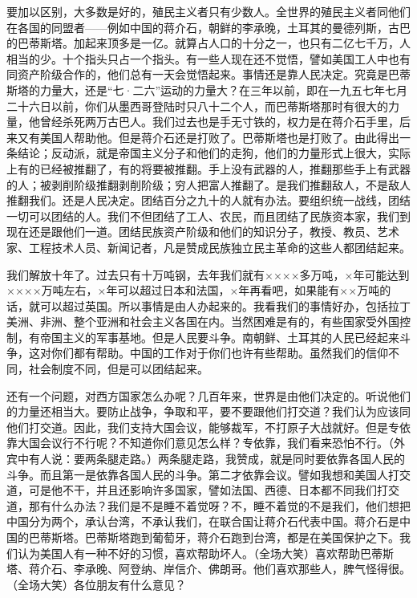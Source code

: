 要加以区别，大多数是好的，殖民主义者只有少数人。全世界的殖民主义者同他们在各国的同盟者——例如中国的蒋介石，朝鲜的李承晚，土耳其的曼德列斯，古巴的巴蒂斯塔。加起来顶多是一亿。就算占人口的十分之一，也只有二亿七千万，人相当的少。十个指头只占一个指头。有一些人现在还不觉悟，譬如美国工人中也有同资产阶级合作的，他们总有一天会觉悟起来。事情还是靠人民决定。究竟是巴蒂斯塔的力量大，还是“七·二六”运动的力量大？在三年以前，即在一九五七年七月二十六日以前，你们从墨西哥登陆时只八十二个人，而巴蒂斯塔那时有很大的力量，他曾经杀死两万古巴人。我们过去也是手无寸铁的，权力是在蒋介石手里，后来又有美国人帮助他。但是蒋介石还是打败了。巴蒂斯塔也是打败了。由此得出一条结论；反动派，就是帝国主义分子和他们的走狗，他们的力量形式上很大，实际上有的已经被推翻了，有的将要被推翻。手上没有武器的人，推翻那些手上有武器的人；被剥削阶级推翻剥削阶级；穷人把富人推翻了。是我们推翻敌人，不是敌人推翻我们。还是人民决定。团结百分之九十的人就有办法。要组织统一战线，团结一切可以团结的人。我们不但团结了工人、农民，而且团结了民族资本家，我们到现在还是跟他们一道。团结民族资产阶级和他们的知识分子，教授、教员、艺术家、工程技术人员、新闻记者，凡是赞成民族独立民主革命的这些人都团结起来。

我们解放十年了。过去只有十万吨钢，去年我们就有××××多万吨，×年可能达到××××万吨左右，×年可以超过日本和法国，×年再看吧，如果能有××万吨的话，就可以超过英国。所以事情是由人办起来的。我看我们的事情好办，包括拉丁美洲、非洲、整个亚洲和社会主义各国在内。当然困难是有的，有些国家受外国控制，有帝国主义的军事基地。但是人民要斗争。南朝鲜、土耳其的人民已经起来斗争，这对你们都有帮助。中国的工作对于你们也许有些帮助。虽然我们的信仰不同，社会制度不同，但是可以团结起来。

还有一个问题，对西方国家怎么办呢？几百年来，世界是由他们决定的。听说他们的力量还相当大。要防止战争，争取和平，要不要跟他们打交道？我们认为应该同他们打交道。因此，我们支持大国会议，能够裁军，不打原子大战就好。但是专依靠大国会议行不行呢？不知道你们意见怎么样？专依靠，我们看来恐怕不行。（外宾中有人说：要两条腿走路。）两条腿走路，我赞成，就是同时要依靠各国人民的斗争。而且第一是依靠各国人民的斗争。第二才依靠会议。譬如我想和美国人打交道，可是他不干，并且还影响许多国家，譬如法国、西德、日本都不同我们打交道，那有什么办法？我们是不是睡不着觉呀？不，睡不着觉的不是我们，他们想把中国分为两个，承认台湾，不承认我们，在联合国让蒋介石代表中国。蒋介石是中国的巴蒂斯塔。巴蒂斯塔跑到葡萄牙，蒋介石跑到台湾，都是在美国保护之下。我们认为美国人有一种不好的习惯，喜欢帮助坏人。（全场大笑）喜欢帮助巴蒂斯塔、蒋介石、李承晚、阿登纳、岸信介、佛朗哥。他们喜欢那些人，脾气怪得很。（全场大笑）各位朋友有什么意见？

